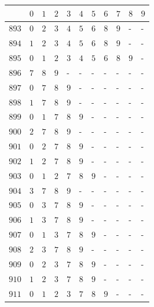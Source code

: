 \begin{appendices}
  \begin{table}[H]
  	\centering
  	\begin{tabular} {|l|l|l|l|l|l|l|l|l|l|l|} \hline
  		\backslashbox{$Num$}{$index$} & $ 0 $ & $ 1 $ & $ 2 $ & $ 3 $ & $ 4 $ & $ 5 $ & $ 6 $ & $ 7 $ & $ 8 $ & $ 9 $ \\ \hline
  		$ 893 $ & $ 0 $ &$ 2 $ &$ 3 $ &$ 4 $ &$ 5 $ &$ 6 $ &$ 8 $ &$ 9 $ & - &  -   \\ \hline
  		$ 894 $ & $ 1 $ &$ 2 $ &$ 3 $ &$ 4 $ &$ 5 $ &$ 6 $ &$ 8 $ &$ 9 $ & - &  -   \\ \hline
  		$ 895 $ & $ 0 $ &$ 1 $ &$ 2 $ &$ 3 $ &$ 4 $ &$ 5 $ &$ 6 $ &$ 8 $ &$ 9 $ & -   \\ \hline
  		$ 896 $ & $ 7 $ &$ 8 $ &$ 9 $ & - &  - &  - &  - &  - &  - &  -   \\ \hline
  		$ 897 $ & $ 0 $ &$ 7 $ &$ 8 $ &$ 9 $ & - &  - &  - &  - &  - &  -   \\ \hline
  		$ 898 $ & $ 1 $ &$ 7 $ &$ 8 $ &$ 9 $ & - &  - &  - &  - &  - &  -   \\ \hline
  		$ 899 $ & $ 0 $ &$ 1 $ &$ 7 $ &$ 8 $ &$ 9 $ & - &  - &  - &  - &  -   \\ \hline
  		$ 900 $ & $ 2 $ &$ 7 $ &$ 8 $ &$ 9 $ & - &  - &  - &  - &  - &  -   \\ \hline
  		$ 901 $ & $ 0 $ &$ 2 $ &$ 7 $ &$ 8 $ &$ 9 $ & - &  - &  - &  - &  -   \\ \hline
  		$ 902 $ & $ 1 $ &$ 2 $ &$ 7 $ &$ 8 $ &$ 9 $ & - &  - &  - &  - &  -   \\ \hline
  		$ 903 $ & $ 0 $ &$ 1 $ &$ 2 $ &$ 7 $ &$ 8 $ &$ 9 $ & - &  - &  - &  -   \\ \hline
  		$ 904 $ & $ 3 $ &$ 7 $ &$ 8 $ &$ 9 $ & - &  - &  - &  - &  - &  -   \\ \hline
  		$ 905 $ & $ 0 $ &$ 3 $ &$ 7 $ &$ 8 $ &$ 9 $ & - &  - &  - &  - &  -   \\ \hline
  		$ 906 $ & $ 1 $ &$ 3 $ &$ 7 $ &$ 8 $ &$ 9 $ & - &  - &  - &  - &  -   \\ \hline
  		$ 907 $ & $ 0 $ &$ 1 $ &$ 3 $ &$ 7 $ &$ 8 $ &$ 9 $ & - &  - &  - &  -   \\ \hline
  		$ 908 $ & $ 2 $ &$ 3 $ &$ 7 $ &$ 8 $ &$ 9 $ & - &  - &  - &  - &  -   \\ \hline
  		$ 909 $ & $ 0 $ &$ 2 $ &$ 3 $ &$ 7 $ &$ 8 $ &$ 9 $ & - &  - &  - &  -   \\ \hline
  		$ 910 $ & $ 1 $ &$ 2 $ &$ 3 $ &$ 7 $ &$ 8 $ &$ 9 $ & - &  - &  - &  -   \\ \hline
  		$ 911 $ & $ 0 $ &$ 1 $ &$ 2 $ &$ 3 $ &$ 7 $ &$ 8 $ &$ 9 $ & - &  - &  -   \\ \hline

\end{tabular}
\end{table}
\end{appendices}
